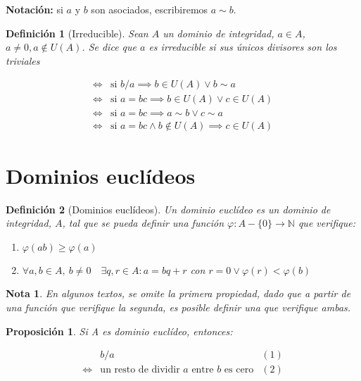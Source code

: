 \documentclass[11pt, a4paper, titlepage]{article}
\newif\IfInSansMode
\theoremstyle{theorem-style}
\newtheorem{nprop}{Proposición}[section]
\theoremstyle{definition-style}
\newtheorem{ndef}{Definición}[section]
\theoremstyle{remark-style}
\newtheorem*{nota}{Nota}
\theoremstyle{example-style}
\newenvironment{nlist}
{\begin{enumerate}
\renewcommand\labelenumi{(\emph{\roman{enumi})}}}
{\end{enumerate}}
\begin{document}
\textbf{Notación:} si $a$ y $b$ son asociados, escribiremos $a \sim b$.

\begin{ndef}[Irreducible]

	Sean $A$ un dominio de integridad, $a\in A$, $a\neq 0, a \notin U(A)$. Se dice que $a$ es irreducible si sus únicos divisores son los triviales

\begin{align*}
	\iff& \text{si } b/a \implies b\in U(A) \vee b \sim a
\\
	\iff& \text{si } a=bc \implies b\in U(A) \vee c \in U(A)
\\
	\iff& \text{si } a=bc \implies a\sim b \vee c \sim a
\\
	\iff& \text{si } a=bc \wedge b \notin U(A) \implies c \in U(A)
\end{align*}
\end{ndef}


\section{Dominios euclídeos}
\begin{ndef}[Dominios euclídeos]

	Un dominio euclídeo es un dominio de integridad, $A$, tal que se pueda definir una función $\varphi: A- \{0\} \to \mathbb{N} $ que verifique:

\begin{nlist}
	\item $\varphi(ab) \ge \varphi(a)$
	\item $\forall a,b \in A,\ b \neq 0 \quad \exists q,r \in A : a = bq + r $ con $r=0 \vee \varphi(r) < \varphi(b)$
\end{nlist}
\end{ndef}

\begin{nota}
  En algunos textos, se omite la primera propiedad, dado que a partir de una función que verifique la segunda, es posible definir una que verifique ambas.
\end{nota}


\begin{nprop}
  Si A es dominio euclídeo, entonces:

  \[
  \begin{array}{lll}
    & b/a & (1) \\
    \iff & \text{un resto de dividir $a$ entre $b$ es cero} & (2) \\
  \end{array}
  \]
\end{nprop}
\end{document}
